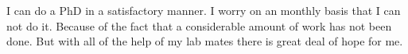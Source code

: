 \documentclass{article}
\begin{document}
I can do a PhD in a satisfactory manner. 
I worry on an monthly basis that I can not do it.
Because of the fact that a considerable amount of work has not been done. 
But with all of the help of my lab mates there is great deal of hope for me. 
\end{document}
